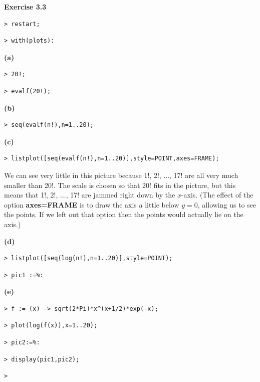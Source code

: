 \documentclass{article}
\begin{document}
\begin{Maple Normal}
\textbf{Exercise 3.3}
\end{Maple Normal}
\begin{lstlisting}
> restart;
\end{lstlisting}
\begin{lstlisting}
> with(plots):
\end{lstlisting}
\begin{Maple Normal}
\textbf{(a)}
\end{Maple Normal}
\begin{lstlisting}
> 20!;
\end{lstlisting}
\begin{lstlisting}
> evalf(20!);
\end{lstlisting}
\begin{Maple Normal}
\textbf{(b)}
\end{Maple Normal}
\begin{lstlisting}
> seq(evalf(n!),n=1..20);
\end{lstlisting}
\begin{Maple Normal}
\textbf{(c)}
\end{Maple Normal}
\begin{lstlisting}
> listplot([seq(evalf(n!),n=1..20)],style=POINT,axes=FRAME);
\end{lstlisting}
\begin{Maple Normal}
We can see very little in this picture because 1!, 2!, ..., 17! are all very much smaller than 20!.  The scale is chosen so that 20! fits in the picture, but this means that 1!, 2!, ..., 17! are jammed right down by the 
$ x  $-axis.  (The effect of the option \textcolor[RGB]{255,0,0}{\textbf{axes=FRAME}} is to draw the axis a little below 
$ y =0 $, allowing us to see the points.  If we left out that option then the points would actually lie on the axis.)
\end{Maple Normal}
\begin{Maple Normal}
\textbf{(d)}
\end{Maple Normal}
\begin{lstlisting}
> listplot([seq(log(n!),n=1..20)],style=POINT);
\end{lstlisting}
\begin{lstlisting}
> pic1 :=%:
\end{lstlisting}
\begin{Maple Normal}
\textbf{(e)}
\end{Maple Normal}
\begin{lstlisting}
> f := (x) -> sqrt(2*Pi)*x^(x+1/2)*exp(-x);
\end{lstlisting}
\begin{lstlisting}
> plot(log(f(x)),x=1..20);
\end{lstlisting}
\begin{lstlisting}
> pic2:=%:
\end{lstlisting}
\begin{lstlisting}
> display(pic1,pic2);
\end{lstlisting}
\begin{lstlisting}
> 
\end{lstlisting}
\end{document}
